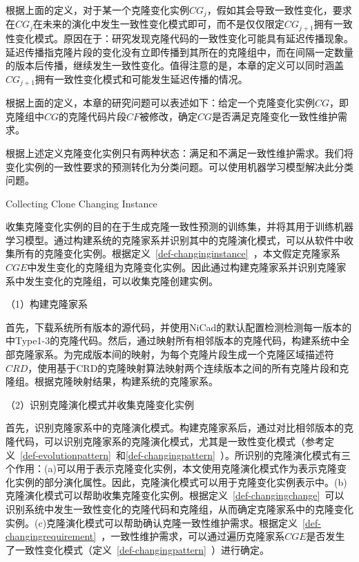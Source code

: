 根据上面的定义，对于某一个克隆变化实例$CG_j$，假如其会导致一致性变化，要求在$CG_j$在未来的演化中发生一致性变化模式即可，而不是仅仅限定$CG_{j+1}$拥有一致性变化模式。原因在于：研究发现克隆代码的一致性变化可能具有延迟传播现象\cite{barbour2011late,mondal2016comparative}。延迟传播指克隆片段的变化没有立即传播到其所在的克隆组中，而在间隔一定数量的版本后传播，继续发生一致性变化。值得注意的是，本章的定义可以同时涵盖$CG_{j+1}$拥有一致性变化模式和可能发生延迟传播的情况。

根据上面的定义，本章的研究问题可以表述如下：给定一个克隆变化实例$CG$，即克隆组中$CG$的克隆代码片段$CF$被修改，确定$CG$是否满足克隆变化一致性维护需求。

根据上述定义克隆变化实例只有两种状态：满足和不满足一致性维护需求。我们将变化实例的一致性要求的预测转化为分类问题。可以使用机器学习模型解决此分类问题。

{Collecting Clone Changing Instance}

收集克隆变化实例的目的在于生成克隆一致性预测的训练集，并将其用于训练机器学习模型。通过构建系统的克隆家系并识别其中的克隆演化模式，可以从软件中收集所有的克隆变化实例。根据定义~\ref{def-changinginstance}~，本文假定克隆家系$CGE$中发生变化的克隆组为克隆变化实例。因此通过构建克隆家系并识别克隆家系中发生变化的克隆组，可以收集克隆创建实例。

（1）构建克隆家系

首先，下载系统所有版本的源代码，并使用NiCad的默认配置检测检测每一版本的中Type1-3的克隆代码。然后，通过映射所有相邻版本的克隆代码，构建系统中全部克隆家系。为完成版本间的映射，为每个克隆片段生成一个克隆区域描述符 $CRD$\cite{duala2010clone}，使用基于CRD的克隆映射算法映射两个连续版本之间的所有克隆片段和克隆组\cite{ci2013new,ci2013newD}。根据克隆映射结果，构建系统的克隆家系。

（2）识别克隆演化模式并收集克隆变化实例

首先，识别克隆家系中的克隆演化模式。构建克隆家系后，通过对比相邻版本的克隆代码，可以识别克隆家系的克隆演化模式，尤其是一致性变化模式（参考定义~\ref{def-evolutionpattern}~和\ref{def-changingpattern}~）。所识别的克隆演化模式有三个作用：(a)可以用于表示克隆变化实例，本文使用克隆演化模式作为表示克隆变化实例的部分演化属性。因此，克隆演化模式可以用于克隆变化实例表示中。(b)克隆演化模式可以帮助收集克隆变化实例。根据定义~\ref{def-changingchange}~可以识别系统中发生一致性变化的克隆代码和克隆组，从而确定克隆家系中的克隆变化实例。(c)克隆演化模式可以帮助确认克隆一致性维护需求。根据定义~\ref{def-changingrequirement}~，一致性维护需求，可以通过遍历克隆家系$CGE$是否发生了一致性变化模式（定义~\ref{def-changingpattern}~）进行确定。

